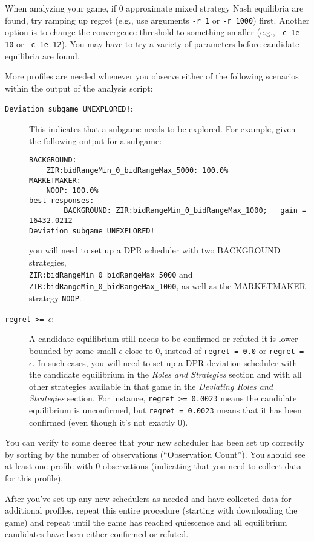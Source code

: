 \documentclass[11pt]{article}
\begin{document}
When analyzing your game, if 0 approximate mixed strategy Nash equilibria are found, try ramping up regret (e.g., use arguments \verb|-r 1| or \verb|-r 1000|) first.
Another option is to change the convergence threshold to something smaller (e.g., \verb|-c 1e-10| or \verb|-c 1e-12|). You may have to try a variety of parameters before candidate equilibria are found.

More profiles are needed whenever you observe either of the following scenarios within the output of the analysis script:
\begin{description}
\item[\texttt{Deviation subgame UNEXPLORED!}:] This indicates that a subgame needs to be explored.
For example, given the following output for a subgame:
\begin{verbatim}
BACKGROUND:
    ZIR:bidRangeMin_0_bidRangeMax_5000: 100.0%
MARKETMAKER:
    NOOP: 100.0%
best responses:
        BACKGROUND: ZIR:bidRangeMin_0_bidRangeMax_1000;   gain = 16432.0212
Deviation subgame UNEXPLORED!
\end{verbatim}
you will need to set up a DPR scheduler with two BACKGROUND strategies, \\
\verb|ZIR:bidRangeMin_0_bidRangeMax_5000| and \verb|ZIR:bidRangeMin_0_bidRangeMax_1000|, as well as the MARKETMAKER strategy \verb|NOOP|.

\item[\texttt{regret >= $\epsilon$}:] A candidate equilibrium still needs to be confirmed or refuted it is lower bounded by some small $\epsilon$ close to 0, instead of \verb|regret = 0.0| or \verb|regret = |$\epsilon$.  In such cases, you will need to set up a DPR deviation scheduler with the candidate equilibrium in the \emph{Roles and Strategies} section and with all other strategies available in that game in the \emph{Deviating Roles and Strategies} section.
For instance, \verb|regret >= 0.0023| means the candidate equilibrium is unconfirmed, but \verb|regret = 0.0023| means that it has been confirmed (even though it's not exactly 0).

\end{description}
You can verify to some degree that your new scheduler has been set up correctly by sorting by the number of observations (``Observation Count''). You should see at least one profile with 0 observations (indicating that you need to collect data for this profile).

After you've set up any new schedulers as needed and have collected data for additional profiles, repeat this entire procedure (starting with downloading the game) and repeat until the game has reached quiescence and all equilibrium candidates have been either confirmed or refuted.



\end{document}
